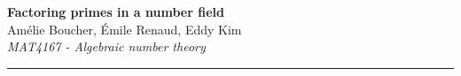 \documentclass[a4paper,12pt]{article}
\begin{document}
\begin{center}
\Large{\textbf{Factoring primes in a number field}}
\vspace{0.4cm}
\normalsize
\\ Amélie Boucher, Émile Renaud, Eddy Kim \\
\vspace{0.1cm}
\textit{MAT4167 - Algebraic number theory}
\medskip
\normalsize
\end{center}
{\color{gray}\hrule}
\medskip



\renewcommand*\contentsname{Table des matières}
\tableofcontents

\medskip


\medskip

\medskip

\medskip

\medskip 

\medskip






\end{document}
